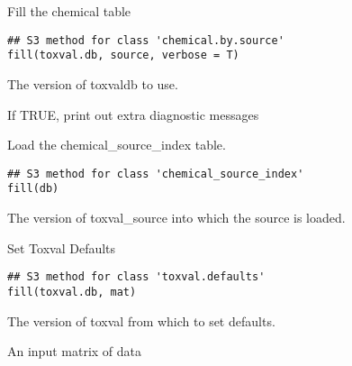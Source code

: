 \documentclass[letterpaper]{book}
\begin{document}
%
\begin{Description}\relax
Fill the chemical table
\end{Description}
%
\begin{Usage}
\begin{verbatim}
## S3 method for class 'chemical.by.source'
fill(toxval.db, source, verbose = T)
\end{verbatim}
\end{Usage}
%
\begin{Arguments}
\begin{ldescription}
\item[\code{toxval.db}] The version of toxvaldb to use.

\item[\code{verbose}] If TRUE, print out extra diagnostic messages
\end{ldescription}
\end{Arguments}
%
\begin{Description}\relax
Load the chemical\_source\_index table.
\end{Description}
%
\begin{Usage}
\begin{verbatim}
## S3 method for class 'chemical_source_index'
fill(db)
\end{verbatim}
\end{Usage}
%
\begin{Arguments}
\begin{ldescription}
\item[\code{db}] The version of toxval\_source into which the source is loaded.
\end{ldescription}
\end{Arguments}
%
\begin{Description}\relax
Set Toxval Defaults
\end{Description}
%
\begin{Usage}
\begin{verbatim}
## S3 method for class 'toxval.defaults'
fill(toxval.db, mat)
\end{verbatim}
\end{Usage}
%
\begin{Arguments}
\begin{ldescription}
\item[\code{toxval.db}] The version of toxval from which to set defaults.

\item[\code{mat}] An input matrix of data
\end{ldescription}
\end{Arguments}
\end{document}
